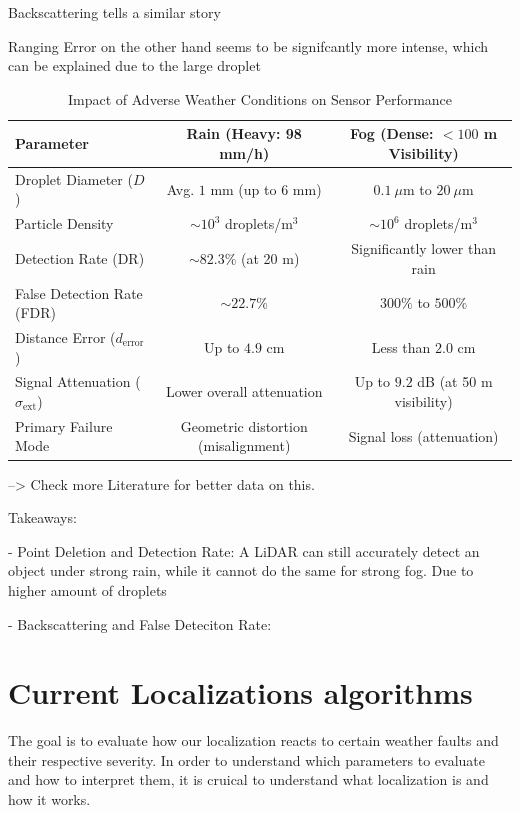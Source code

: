 Backscattering tells a similar story

Ranging Error on the other hand seems to be signifcantly more intense, which can be explained due to the large droplet \cite{haider_methodology_2023}

\begin{table}[h!]
\centering
\caption{Impact of Adverse Weather Conditions on Sensor Performance}
\label{tab:weather_comparison}
\begin{tabular}{lcc}
\hline
\textbf{Parameter} & \textbf{Rain (Heavy: 98 mm/h)} & \textbf{Fog (Dense: $<100$ m Visibility)} \\
\hline
Droplet Diameter ($D$) 
& Avg. $1$ mm (up to $6$ mm) 
& $0.1~\mu$m to $20~\mu$m \\

Particle Density 
& $\sim 10^{3}$ droplets/m$^{3}$ 
& $\sim 10^{6}$ droplets/m$^{3}$ \\

Detection Rate (DR) 
& $\sim 82.3\%$ (at 20 m) 
& Significantly lower than rain \\

False Detection Rate (FDR) 
& $\sim 22.7\%$ 
& $300\%$ to $500\%$ \\

Distance Error ($d_{\text{error}}$) 
& Up to $4.9$ cm 
& Less than $2.0$ cm \\

Signal Attenuation ($\sigma_{\text{ext}}$) 
& Lower overall attenuation 
& Up to $9.2$ dB (at 50 m visibility) \\

Primary Failure Mode 
& Geometric distortion (misalignment) 
& Signal loss (attenuation) \\
\hline
\end{tabular}
\end{table}

--> Check more Literature for better data on this. 

Takeaways: 

- Point Deletion and Detection Rate: A LiDAR can still accurately detect an object under strong rain, while it cannot do the same for strong fog. Due to higher amount of droplets

- Backscattering and False Deteciton Rate: 
\section{Current Localizations algorithms}
The goal is to evaluate how our localization reacts to certain weather faults and their respective severity. In order to understand which parameters to evaluate and how to interpret them, it is cruical to understand what localization is and how it works. 

